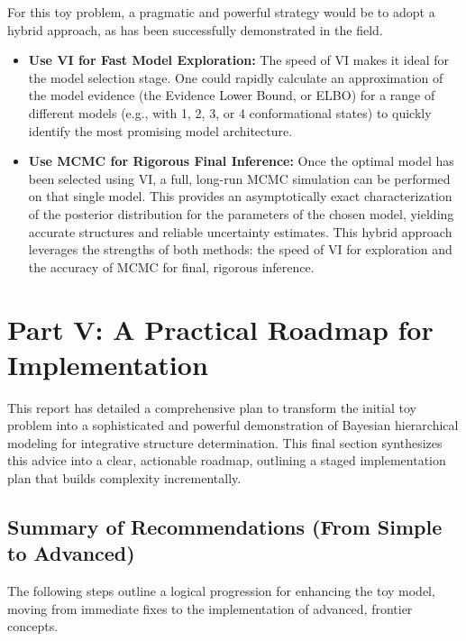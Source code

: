 \documentclass{article}
\begin{document}
For this toy problem, a pragmatic and powerful strategy would be to adopt a hybrid approach, as has been successfully demonstrated in the field.\cite{ref40}

\begin{itemize}
  \item \textbf{Use VI for Fast Model Exploration:} The speed of VI makes it ideal for the model selection stage. One could rapidly calculate an approximation of the model evidence (the Evidence Lower Bound, or ELBO) for a range of different models (e.g., with 1, 2, 3, or 4 conformational states) to quickly identify the most promising model architecture.
  \item \textbf{Use MCMC for Rigorous Final Inference:} Once the optimal model has been selected using VI, a full, long-run MCMC simulation can be performed on that single model. This provides an asymptotically exact characterization of the posterior distribution for the parameters of the chosen model, yielding accurate structures and reliable uncertainty estimates. This hybrid approach leverages the strengths of both methods: the speed of VI for exploration and the accuracy of MCMC for final, rigorous inference.
\end{itemize}

\section{Part V: A Practical Roadmap for Implementation}

This report has detailed a comprehensive plan to transform the initial toy problem into a sophisticated and powerful demonstration of Bayesian hierarchical modeling for integrative structure determination. This final section synthesizes this advice into a clear, actionable roadmap, outlining a staged implementation plan that builds complexity incrementally.

\subsection{Summary of Recommendations (From Simple to Advanced)}

The following steps outline a logical progression for enhancing the toy model, moving from immediate fixes to the implementation of advanced, frontier concepts.
\end{document}
